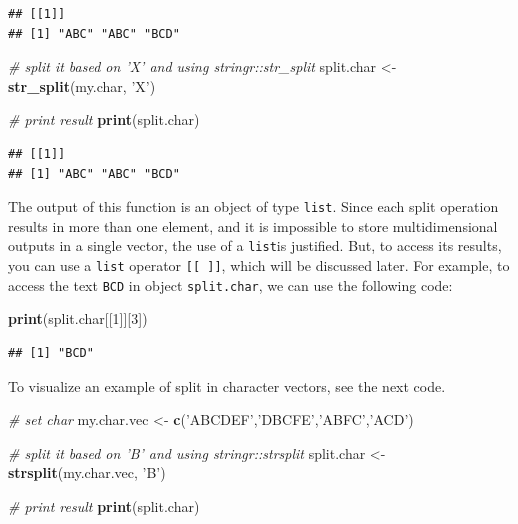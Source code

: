 \documentclass[11pt,]{book}
\newenvironment{Shaded}{\begin{snugshade}}{\end{snugshade}}
\newcommand{\KeywordTok}[1]{\textcolor[rgb]{0.27,0.27,0.27}{\textbf{#1}}}
\newcommand{\DecValTok}[1]{\textcolor[rgb]{0.06,0.06,0.06}{#1}}
\newcommand{\StringTok}[1]{\textcolor[rgb]{0.5,0.5,0.5}{#1}}
\newcommand{\CommentTok}[1]{\textcolor[rgb]{0.56,0.35,0.01}{\textit{#1}}}
\newcommand{\NormalTok}[1]{#1}
\begin{document}
\begin{verbatim}
## [[1]]
## [1] "ABC" "ABC" "BCD"
\end{verbatim}

\begin{Shaded}
\begin{Highlighting}[]
\CommentTok{# split it based on 'X' and using stringr::str_split}
\NormalTok{split.char <-}\StringTok{ }\KeywordTok{str_split}\NormalTok{(my.char, }\StringTok{'X'}\NormalTok{)}

\CommentTok{# print result}
\KeywordTok{print}\NormalTok{(split.char)}
\end{Highlighting}
\end{Shaded}

\begin{verbatim}
## [[1]]
## [1] "ABC" "ABC" "BCD"
\end{verbatim}

The output of this function is an object of type \texttt{list}. Since
each split operation results in more than one element, and it is
impossible to store multidimensional outputs in a single vector, the use
of a \texttt{list}is justified. But, to access its results, you can use
a \texttt{list} operator \texttt{{[}{[}\ {]}{]}}, which will be
discussed later. For example, to access the text \texttt{BCD} in object
\texttt{split.char}, we can use the following code:

\begin{Shaded}
\begin{Highlighting}[]
\KeywordTok{print}\NormalTok{(split.char[[}\DecValTok{1}\NormalTok{]][}\DecValTok{3}\NormalTok{])}
\end{Highlighting}
\end{Shaded}

\begin{verbatim}
## [1] "BCD"
\end{verbatim}

To visualize an example of split in character vectors, see the next
code.

\begin{Shaded}
\begin{Highlighting}[]
\CommentTok{# set char}
\NormalTok{my.char.vec <-}\StringTok{ }\KeywordTok{c}\NormalTok{(}\StringTok{'ABCDEF'}\NormalTok{,}\StringTok{'DBCFE'}\NormalTok{,}\StringTok{'ABFC'}\NormalTok{,}\StringTok{'ACD'}\NormalTok{)}

\CommentTok{# split it based on 'B' and using stringr::strsplit}
\NormalTok{split.char <-}\StringTok{ }\KeywordTok{strsplit}\NormalTok{(my.char.vec, }\StringTok{'B'}\NormalTok{)}

\CommentTok{# print result}
\KeywordTok{print}\NormalTok{(split.char)}
\end{Highlighting}
\end{Shaded}
\end{document}
